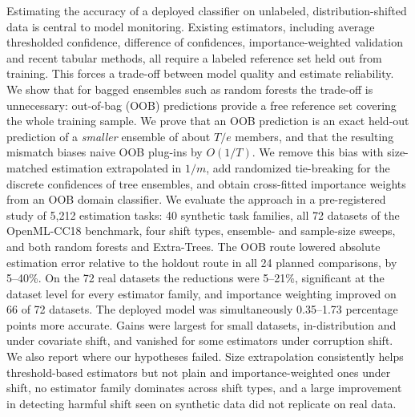 Estimating the accuracy of a deployed classifier on unlabeled, distribution-shifted data is central to model monitoring. Existing estimators, including average thresholded confidence, difference of confidences, importance-weighted validation and recent tabular methods, all require a labeled reference set held out from training. This forces a trade-off between model quality and estimate reliability. We show that for bagged ensembles such as random forests the trade-off is unnecessary: out-of-bag (OOB) predictions provide a free reference set covering the whole training sample. We prove that an OOB prediction is an exact held-out prediction of a \emph{smaller} ensemble of about $T/e$ members, and that the resulting mismatch biases naive OOB plug-ins by $O(1/T)$. We remove this bias with size-matched estimation extrapolated in $1/m$, add randomized tie-breaking for the discrete confidences of tree ensembles, and obtain cross-fitted importance weights from an OOB domain classifier. We evaluate the approach in a pre-registered study of 5{,}212 estimation tasks: 40 synthetic task families, all 72 datasets of the OpenML-CC18 benchmark, four shift types, ensemble- and sample-size sweeps, and both random forests and Extra-Trees. The OOB route lowered absolute estimation error relative to the holdout route in all 24 planned comparisons, by 5--40\%. On the 72 real datasets the reductions were 5--21\%, significant at the dataset level for every estimator family, and importance weighting improved on 66 of 72 datasets. The deployed model was simultaneously 0.35--1.73 percentage points more accurate. Gains were largest for small datasets, in-distribution and under covariate shift, and vanished for some estimators under corruption shift. We also report where our hypotheses failed. Size extrapolation consistently helps threshold-based estimators but not plain and importance-weighted ones under shift, no estimator family dominates across shift types, and a large improvement in detecting harmful shift seen on synthetic data did not replicate on real data.
